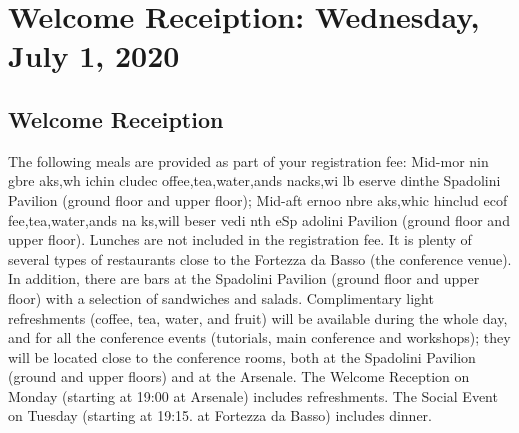 \chapter{Welcome Receiption: Wednesday, July 1, 2020}
\section{Welcome Receiption}
\vspace*{0.2cm}

The following meals are provided as part of your registration fee:
Mid-mor nin gbre aks,wh ichin cludec offee,tea,water,ands nacks,wi lb eserve dinthe Spadolini Pavilion (ground floor and upper floor);
Mid-aft ernoo nbre aks,whic hinclud ecof fee,tea,water,ands na ks,will beser vedi nth eSp adolini Pavilion (ground floor and upper floor).
Lunches are not included in the registration fee. It is plenty of several types of restaurants close to the Fortezza da Basso (the conference venue). In addition, there are bars at the Spadolini Pavilion (ground floor and upper floor) with a selection of sandwiches and salads.
Complimentary light refreshments (coffee, tea, water, and fruit) will be available during the whole day, and for all the conference events (tutorials, main conference and workshops); they will be located close to the conference rooms, both at the Spadolini Pavilion (ground and upper floors) and at the Arsenale.
The Welcome Reception on Monday (starting at 19:00 at Arsenale) includes refreshments. The Social Event on Tuesday (starting at 19:15. at Fortezza da Basso) includes dinner.